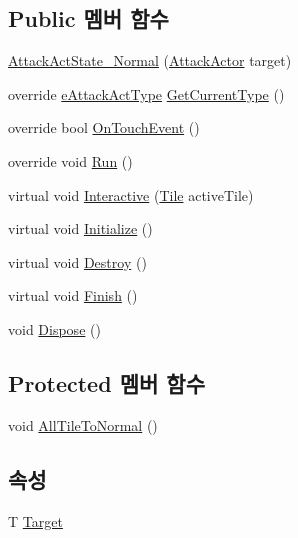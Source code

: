 \subsection*{Public 멤버 함수}
\begin{DoxyCompactItemize}
\item 
\hyperlink{class_attack_actor_1_1_attack_act_state___normal_ab68b0ac3deec2c36e132dd8d635eef94}{Attack\+Act\+State\+\_\+\+Normal} (\hyperlink{class_attack_actor}{Attack\+Actor} target)
\item 
override \hyperlink{_attack_actor_8cs_a10659ce944335df4ded984f6bc41f31b}{e\+Attack\+Act\+Type} \hyperlink{class_attack_actor_1_1_attack_act_state___normal_a82484dc7be509e6a7a761c3c2b24a64a}{Get\+Current\+Type} ()
\item 
override bool \hyperlink{class_attack_actor_1_1_attack_act_state___normal_ac68685fce5e63f5b1d5fc3e8e74a5621}{On\+Touch\+Event} ()
\item 
override void \hyperlink{class_attack_actor_1_1_attack_act_state___normal_a7d6644fed269325b8f62138d8adb50f5}{Run} ()
\item 
virtual void \hyperlink{class_attack_actor_1_1_attack_act_state_a2ae9dd2f7ec8db76d25d7ad7ed58b89d}{Interactive} (\hyperlink{class_tile}{Tile} active\+Tile)
\item 
virtual void \hyperlink{class_f_z_1_1_state_a27ac6fd2e844476017b35aa781d73c8c}{Initialize} ()
\item 
virtual void \hyperlink{class_f_z_1_1_state_aa85fdf4a5495d6d5d3ed4aeda3497c8a}{Destroy} ()
\item 
virtual void \hyperlink{class_f_z_1_1_state_a288bb8c3fceee4bf03f01e295dcef1be}{Finish} ()
\item 
void \hyperlink{class_f_z_1_1_state_a598887d3fbb412fada132dc1c079b25b}{Dispose} ()
\end{DoxyCompactItemize}
\subsection*{Protected 멤버 함수}
\begin{DoxyCompactItemize}
\item 
void \hyperlink{class_attack_actor_1_1_attack_act_state_a993762ec959af926e416f03fa7b71203}{All\+Tile\+To\+Normal} ()
\end{DoxyCompactItemize}
\subsection*{속성}
\begin{DoxyCompactItemize}
\item 
T \hyperlink{class_f_z_1_1_state_a6927f5c9f2517052f9dc5596188e9d95}{Target}
\end{DoxyCompactItemize}


